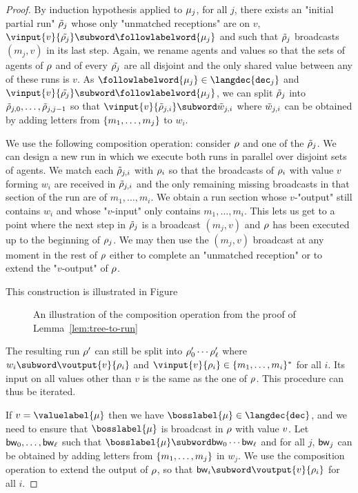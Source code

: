 \begin{proof}
By induction hypothesis applied to $\mu_j$, for all $j$, there exists an "initial partial run" $\Tilde{\rho}_j$ whose only "unmatched receptions" are on $v$, $\vinput{v}{\Tilde{\run_j}} \subword \followlabelword{\node_{j}}$ and such that $\Tilde{\rho}_j$ broadcasts $(m_j,v)$ in its last step. Again, we rename agents and values so that the sets of agents of $\rho$ and of every $\Tilde{\rho_j}$ are all disjoint and the only shared value between any of these runs is $v$.
As $\followlabelword{\node_{j}} \in \langdec{\decsymb_j}$ and $\vinput{v}{\Tilde{\run_j}} \subword \followlabelword{\node_{j}}$, we can split $\Tilde{\rho}_j$ into $\Tilde{\rho}_{j, 0}, \ldots, \Tilde{\rho}_{j,j-1}$ so that  $\vinput{v}{\Tilde{\run}_{j, i}} \subword \Tilde{w}_{j,i}$ where $\Tilde{w}_{j,i}$ can be obtained by adding letters from $\{m_1, \ldots, m_j\}$ to $w_i$.

We use the following composition operation: consider $\rho$ and one of the $\Tilde{\rho}_j$. We can design a new run in which we execute both runs in parallel over disjoint sets of agents. We match each $\Tilde{\rho}_{j, i}$ with $\rho_i$ so that the broadcasts of $\rho_i$ with value $v$ forming $w_i$ are received in $\Tilde{\rho}_{j, i}$ and the only remaining missing broadcasts in that section of the run are of $m_1, \ldots, m_i$. 
We obtain a run section whose $v$-"output" still contains $w_i$ and whose "$v$-input" only contains $m_1, \ldots, m_i$.
This lets us get to a point where the next step in $\Tilde{\rho}_j$ is a broadcast $(m_j,v)$ and $\rho$ has been executed up to the beginning of $\rho_j$. We may then use the $(m_j,v)$ broadcast at any moment in the rest of $\rho$ either to complete an "unmatched reception" or to extend the "$v$-output" of $\rho$.


 This construction is illustrated in Figure
 \begin{figure}
	 	
	 	\caption{An illustration of the composition operation from the proof of Lemma~\ref{lem:tree-to-run}}
	 	\label{fig:tree-to-run}
	 \end{figure}

The resulting run $\rho'$ can still be split into $\rho'_0 \cdots \rho'_\ell$ where $w_i \subword \voutput{\aval}{\run_i}$ and $\vinput{\aval}{\run_i} \in \set{m_1, \dots, m_{i}}^*$ for all $i$. Its input on all values other than $v$ is the same as the one of $\rho$. This procedure can thus be iterated.

If $\val = \valuelabel{\node}$ then we have $\bosslabel{\node} \in \langdec{\decsymb}$, and we need to ensure that $\bosslabel{\node}$ is broadcast in $\rho$ with value $v$.
Let $\mathsf{bw}_0, \ldots, \mathsf{bw}_\ell$ such that $\bosslabel{\node} \subword \bossspec_0\cdots\bossspec_\ell$ and for all $j$, $\mathsf{bw}_j$ can be obtained by adding letters from $\{m_1,\ldots, m_j\}$ in $w_j$.
We use the composition operation to extend the output of $\rho$, so that $\bossspec_i \subword \voutput{v}{\run_i}$ for all $i$.


\end{proof}
